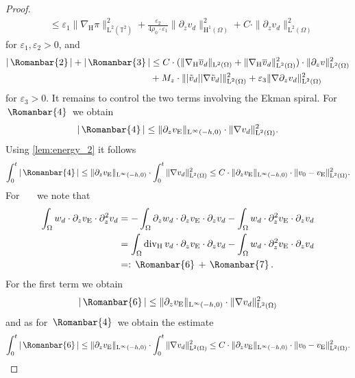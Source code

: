 \documentclass[preprint]{elsarticle}
\numberwithin{equation}{section}
\newcommand {\T}	{\mathbb{T}}
\DeclareMathOperator{\divH}{div_{\H}}
\renewcommand{\H}{\mathrm{H}}
\renewcommand{\bar}[1]{\overline{#1}}
\newcommand{\vbar}{\bar{v}}
\newcommand{\vtilde}{\tilde{v}}
\newcommand{\nablaH}{\nabla_{\H}}
\newcommand{\rL}{\mathrm{L}}
\newcommand{\rH}{\H}
\newcommand{\rE}{\mathrm{E}}
\newcommand{\II}{\, \Romanbar{2}\, }
\newcommand{\III}{\, \Romanbar{3}\, }
\newcommand{\IV}{\, \Romanbar{4}\, }
\newcommand{\V}{\, \Romanbar{5}\, }
\newcommand{\VI}{\, \Romanbar{6}\, }
\newcommand{\VII}{\, \Romanbar{7}\, }
\begin{document}
\begin{proof}
\begin{align*}
		&\leq \varepsilon_1 \| \nablaH \pi \|_{\rL^2(\T^2)}^2
		+ \frac{\varepsilon_2}{4 \rho_0 \cdot \varepsilon_1} \| \partial_z v_d\|_{\rH^{1}(\Omega)}^2
		+ C \cdot \| \partial_z v_d\|_{\rL^2(\Omega)}^2
	\end{align*}
	for $\varepsilon_1,\varepsilon_2 >0$,
	and
	\begin{align*}
		|\II| + |\III|
		&\leq
		C \cdot(\| \nablaH \vbar_d \|_{\rL^2(\Omega)} + \| \nablaH \vbar_d \|_{\rL^2(\Omega)}^2) \cdot \| \partial_z v \|_{\rL^2(\Omega)}^2 \\
		&+ M_z \cdot \| |\vtilde_d| |\nabla\vtilde_d| \|_{\rL^2(\Omega)}^2
		+ \varepsilon_3 \| \nabla \partial_z v_d \|_{\rL^2(\Omega)}^2 
	\end{align*}
	for $\varepsilon_3 > 0$.
	It remains to control the two terms involving the Ekman spiral. 
	For $\IV$ we obtain
	\begin{equation*}
		| \IV |
		\leq 
		\| \partial_z v_{\rE} \|_{\rL^\infty(-h,0)}
		\cdot \| \nabla v_d \|_{\rL^2(\Omega)}^2 .
	\end{equation*}
	Using \autoref{lem:energy_2} it follows
	\begin{equation*}
		\int_0^t |\IV|
		\leq \| \partial_z v_{\rE} \|_{\rL^\infty(-h,0)} 
		\cdot \int_0^t \| \nabla v_d \|_{\rL^2(\Omega)}^2
		\leq C \cdot \| \partial_z v_{\rE} \|_{\rL^\infty(-h,0)} \cdot \| v_0 - v_{\rE} \|_{\rL^2(\Omega)}^2 .
	\end{equation*}
	For \V \ we note that 
	\begin{align*}
		\int_\Omega w_d \cdot \partial_z v_{\rE} \cdot \partial_z^2 v_d
		&= - \int_\Omega \partial_z w_d \cdot \partial_z v_{\rE} \cdot \partial_z v_d
		- \int_\Omega  w_d \cdot \partial_z^2 v_{\rE} \cdot \partial_z v_d \\ 
		&= \int_\Omega \divH v_d \cdot \partial_z v_{\rE} \cdot \partial_z v_d
		- \int_\Omega  w_d \cdot \partial_z^2 v_{\rE} \cdot \partial_z v_d \\
		&=: \VI + \VII . 
	\end{align*}
	For the first term we obtain
	\begin{equation*}
		|\VI|
		\leq \| \partial_z v_{\rE} \|_{\rL^\infty(-h,0)}
		\cdot  \| \nabla v_d \|_{\rL^2(\Omega)}^2  
	\end{equation*}
	and as for $\IV$ we obtain the estimate
	\begin{equation*}
		\int_0^t |\VI|
		\leq \| \partial_z v_{\rE} \|_{\rL^\infty(-h,0)} 
		\cdot \int_0^t \| \nabla v_d \|_{\rL^2(\Omega)}^2
		\leq C \cdot \| \partial_z v_{\rE} \|_{\rL^\infty(-h,0)} \cdot \| v_0 - v_{\rE} \|_{\rL^2(\Omega)}^2 .

\end{equation*}
\end{proof}
\end{document}
